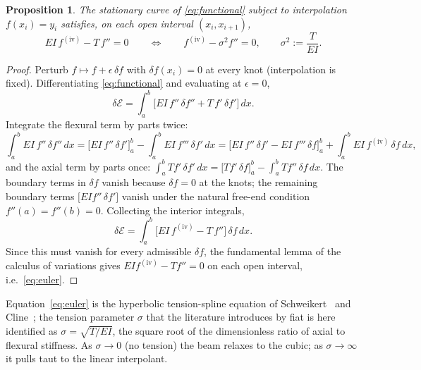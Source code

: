 \documentclass[10pt]{article}
\newtheorem{proposition}{Proposition}
\begin{document}
\begin{proposition}\label{prop:euler}
The stationary curve of \eqref{eq:functional} subject to interpolation
$f(x_i)=y_i$ satisfies, on each open interval $(x_i,x_{i+1})$,
\begin{equation}
EI\,f^{(\mathrm{iv})}-T\,f''=0
\qquad\Longleftrightarrow\qquad
f^{(\mathrm{iv})}-\sigma^2 f''=0,\qquad \sigma^2:=\frac{T}{EI}.
\label{eq:euler}
\end{equation}
\end{proposition}
\begin{proof}
Perturb $f\mapsto f+\epsilon\,\delta f$ with $\delta f(x_i)=0$ at every knot (interpolation is
fixed). Differentiating \eqref{eq:functional} and evaluating at $\epsilon=0$,
\[
\delta\mathcal{E}=\int_a^b\!\big[EI\,f''\,\delta f''+T\,f'\,\delta f'\big]\,dx .
\]
Integrate the flexural term by parts twice:
\[
\int_a^b EI\,f''\,\delta f''\,dx
=\big[EI\,f''\,\delta f'\big]_a^b-\int_a^b EI\,f'''\,\delta f'\,dx
=\big[EI\,f''\,\delta f'-EI\,f'''\,\delta f\big]_a^b+\int_a^b EI\,f^{(\mathrm{iv})}\,\delta f\,dx,
\]
and the axial term by parts once:
$\int_a^b T f'\,\delta f'\,dx=\big[T f'\,\delta f\big]_a^b-\int_a^b T f''\,\delta f\,dx$.
The boundary terms in $\delta f$ vanish because $\delta f=0$ at the knots; the remaining
boundary terms $\big[EI f''\,\delta f'\big]$ vanish under the natural free-end condition
$f''(a)=f''(b)=0$. Collecting the interior integrals,
\[
\delta\mathcal{E}=\int_a^b\!\big[EI\,f^{(\mathrm{iv})}-T\,f''\big]\,\delta f\,dx .
\]
Since this must vanish for every admissible $\delta f$, the fundamental lemma of the calculus of
variations gives $EI f^{(\mathrm{iv})}-T f''=0$ on each open interval, i.e.\ \eqref{eq:euler}.
\end{proof}

Equation~\eqref{eq:euler} is the hyperbolic tension-spline equation of Schweikert~\cite{Schweikert}
and Cline~\cite{Cline}; the tension parameter $\sigma$ that the literature introduces by fiat is
here identified as $\sigma=\sqrt{T/EI}$, the square root of the dimensionless ratio of axial to
flexural stiffness. As $\sigma\to0$ (no tension) the beam relaxes to the cubic; as
$\sigma\to\infty$ it pulls taut to the linear interpolant.
\end{document}
